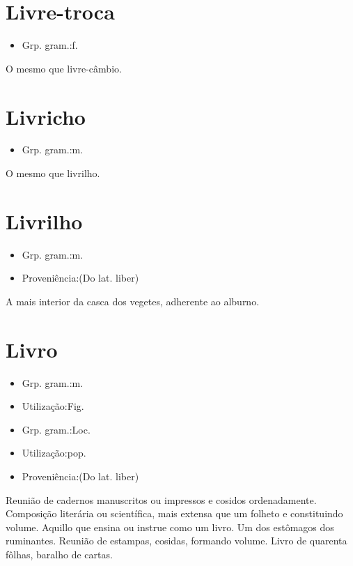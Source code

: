 \section{Livre-troca}
\begin{itemize}
\item {Grp. gram.:f.}
\end{itemize}
O mesmo que \textunderscore livre-câmbio\textunderscore .
\section{Livricho}
\begin{itemize}
\item {Grp. gram.:m.}
\end{itemize}
O mesmo que \textunderscore livrilho\textunderscore .
\section{Livrilho}
\begin{itemize}
\item {Grp. gram.:m.}
\end{itemize}
\begin{itemize}
\item {Proveniência:(Do lat. \textunderscore liber\textunderscore )}
\end{itemize}
A mais interior da casca dos vegetes, adherente ao alburno.
\section{Livro}
\begin{itemize}
\item {Grp. gram.:m.}
\end{itemize}
\begin{itemize}
\item {Utilização:Fig.}
\end{itemize}
\begin{itemize}
\item {Grp. gram.:Loc.}
\end{itemize}
\begin{itemize}
\item {Utilização:pop.}
\end{itemize}
\begin{itemize}
\item {Proveniência:(Do lat. \textunderscore liber\textunderscore )}
\end{itemize}
Reunião de cadernos manuscritos ou impressos e cosidos ordenadamente.
Composição literária ou scientífica, mais extensa que um folheto e constituindo volume.
Aquillo que ensina ou instrue como um livro.
Um dos estômagos dos ruminantes.
Reunião de estampas, cosidas, formando volume.
\textunderscore Livro de quarenta fôlhas\textunderscore , baralho de cartas.
